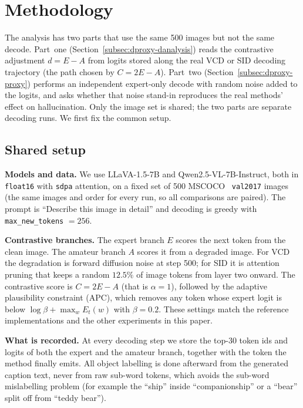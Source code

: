 \documentclass{article}
\begin{document}

\section{Methodology}
\label{sec:dproxy-method}

The analysis has two parts that use the same 500 images but not the same decode.
Part~one (Section~\ref{subsec:dproxy-danalysis}) reads the contrastive adjustment
$d = E - A$ from logits stored along the real VCD or SID decoding trajectory (the
path chosen by $C = 2E - A$). Part~two (Section~\ref{subsec:dproxy-proxy})
performs an independent expert-only decode with random noise added to the logits,
and asks whether that noise stand-in reproduces the real methods' effect on
hallucination. Only the image set is shared; the two parts are separate decoding
runs. We first fix the common setup.

\subsection{Shared setup}
\label{subsec:dproxy-setup}

\textbf{Models and data.} We use LLaVA-1.5-7B and Qwen2.5-VL-7B-Instruct, both in
\texttt{float16} with \texttt{sdpa} attention, on a fixed set of 500 MSCOCO~\citep{lin2014coco}
\texttt{val2017} images (the same images and order for every run, so all
comparisons are paired). The prompt is ``Describe this image in detail'' and
decoding is greedy with \texttt{max\_new\_tokens} $=256$.

\textbf{Contrastive branches.} The expert branch $E$ scores the next token from
the clean image. The amateur branch $A$ scores it from a degraded image. For VCD
the degradation is forward diffusion noise at step 500; for SID it is attention
pruning that keeps a random $12.5\%$ of image tokens from layer two onward. The
contrastive score is $C = 2E - A$ (that is $\alpha = 1$), followed by the
adaptive plausibility constraint (APC), which removes any token whose expert
logit is below $\log\beta + \max_w E_t(w)$ with $\beta = 0.2$. These settings
match the reference implementations and the other experiments in this paper.

\textbf{What is recorded.} At every decoding step we store the top-30 token ids
and logits of both the expert and the amateur branch, together with the token
the method finally emits. All object labelling is done afterward from the
generated caption text, never from raw sub-word tokens, which avoids the sub-word
mislabelling problem (for example the ``ship'' inside ``companionship'' or a
``bear'' split off from ``teddy bear'').
\end{document}
